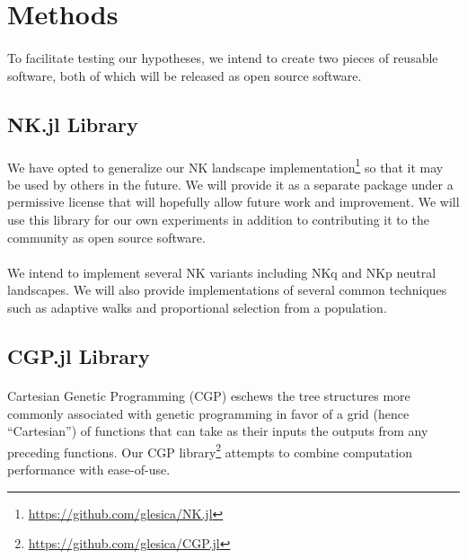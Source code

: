 \documentclass[12pt,letterpaper,titlepage,draft]{article}
\begin{document}
\section{Methods}

\paragraph{}
To facilitate testing our hypotheses, we intend to create two pieces of
reusable software, both of which will be released as open source software.

\subsection{NK.jl Library}

\paragraph{}
We have opted to generalize our NK landscape
implementation\footnote{\url{https://github.com/glesica/NK.jl}} so that it may
be used by others in the future. We will provide it as a separate package under
a permissive license that will hopefully allow future work and improvement.  We
will use this library for our own experiments in addition to contributing it to
the community as open source software.

\paragraph{}
We intend to implement several NK variants including NKq and NKp neutral
landscapes. We will also provide implementations of several common techniques
such as adaptive walks and proportional selection from a population.

\subsection{CGP.jl Library}

\paragraph{}
Cartesian Genetic Programming (CGP) eschews the tree structures more commonly
associated with genetic programming in favor of a grid (hence ``Cartesian'') of
functions that can take as their inputs the outputs from any preceding
functions. Our CGP library\footnote{\url{https://github.com/glesica/CGP.jl}}
attempts to combine computation performance with ease-of-use.
\end{document}
